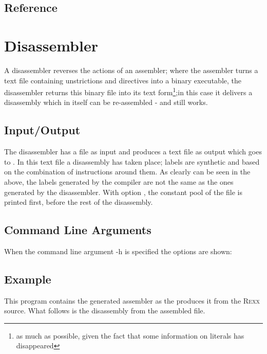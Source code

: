 \section{Reference}

\chapter{\crexx{} Disassembler}\label{disassembler}
A disassembler reverses the actions of an assembler; where the
assembler turns a text file containing unstrictions and directives
into a binary executable, the disassembler returns this binary file
into its text form\footnote{as much as possible, given the fact that
  some information on literals has disappeared};in this case it
delivers a disassembly which in itself can be re-assembled - and still
works. 

\section{Input/Output}

The  disassembler has a  file as input and
produces a text file as output which goes to . In this
text file a disassembly has taken place; labels are synthetic and
based on the combination of instructions around them. As clearly can
be seen in the above, the labels generated by the \crexx{} compiler
are not the same as the ones generated by the disassembler. With
option , the constant pool of the  file is
printed first, before the rest of the disassembly. 

\section{Command Line Arguments}
When the command line argument -h is specified the options are shown:\\
\begin{shaded}
  \small
  \obeylines {}
 \end{shaded}

 \section{Example}
 
 
This program contains the generated assembler as the 
produces it from the \textsc{Rexx} source. What follows is the
disassembly from the assembled  file.
 

